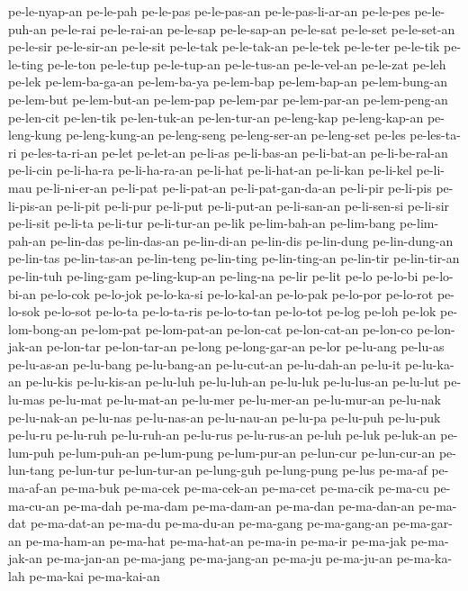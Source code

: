 {pe-le-nyap-an pe-le-pah pe-le-pas pe-le-pas-an pe-le-pas-li-ar-an
pe-le-pes pe-le-puh-an pe-le-rai pe-le-rai-an pe-le-sap pe-le-sap-an
pe-le-sat pe-le-set pe-le-set-an pe-le-sir pe-le-sir-an pe-le-sit
pe-le-tak pe-le-tak-an pe-le-tek pe-le-ter pe-le-tik pe-le-ting pe-le-ton
pe-le-tup pe-le-tup-an pe-le-tus-an pe-le-vel-an pe-le-zat pe-leh pe-lek
pe-lem-ba-ga-an pe-lem-ba-ya pe-lem-bap pe-lem-bap-an pe-lem-bung-an
pe-lem-but pe-lem-but-an pe-lem-pap pe-lem-par pe-lem-par-an
pe-lem-peng-an pe-len-cit pe-len-tik pe-len-tuk-an pe-len-tur-an
pe-leng-kap pe-leng-kap-an pe-leng-kung pe-leng-kung-an pe-leng-seng
pe-leng-ser-an pe-leng-set pe-les pe-les-ta-ri pe-les-ta-ri-an pe-let
pe-let-an pe-li-as pe-li-bas-an pe-li-bat-an pe-li-be-ral-an pe-li-cin
pe-li-ha-ra pe-li-ha-ra-an pe-li-hat pe-li-hat-an pe-li-kan pe-li-kel
pe-li-mau pe-li-ni-er-an pe-li-pat pe-li-pat-an pe-li-pat-gan-da-an
pe-li-pir pe-li-pis pe-li-pis-an pe-li-pit pe-li-pur pe-li-put
pe-li-put-an pe-li-san-an pe-li-sen-si pe-li-sir pe-li-sit pe-li-ta
pe-li-tur pe-li-tur-an pe-lik pe-lim-bah-an pe-lim-bang pe-lim-pah-an
pe-lin-das pe-lin-das-an pe-lin-di-an pe-lin-dis pe-lin-dung
pe-lin-dung-an pe-lin-tas pe-lin-tas-an pe-lin-teng pe-lin-ting
pe-lin-ting-an pe-lin-tir pe-lin-tir-an pe-lin-tuh pe-ling-gam
pe-ling-kup-an pe-ling-na pe-lir pe-lit pe-lo pe-lo-bi pe-lo-bi-an
pe-lo-cok pe-lo-jok pe-lo-ka-si pe-lo-kal-an pe-lo-pak pe-lo-por pe-lo-rot
pe-lo-sok pe-lo-sot pe-lo-ta pe-lo-ta-ris pe-lo-to-tan pe-lo-tot pe-log
pe-loh pe-lok pe-lom-bong-an pe-lom-pat pe-lom-pat-an pe-lon-cat
pe-lon-cat-an pe-lon-co pe-lon-jak-an pe-lon-tar pe-lon-tar-an pe-long
pe-long-gar-an pe-lor pe-lu-ang pe-lu-as pe-lu-as-an pe-lu-bang
pe-lu-bang-an pe-lu-cut-an pe-lu-dah-an pe-lu-it pe-lu-ka-an pe-lu-kis
pe-lu-kis-an pe-lu-luh pe-lu-luh-an pe-lu-luk pe-lu-lus-an pe-lu-lut
pe-lu-mas pe-lu-mat pe-lu-mat-an pe-lu-mer pe-lu-mer-an pe-lu-mur-an
pe-lu-nak pe-lu-nak-an pe-lu-nas pe-lu-nas-an pe-lu-nau-an pe-lu-pa
pe-lu-puh pe-lu-puk pe-lu-ru pe-lu-ruh pe-lu-ruh-an pe-lu-rus pe-lu-rus-an
pe-luh pe-luk pe-luk-an pe-lum-puh pe-lum-puh-an pe-lum-pung pe-lum-pur-an
pe-lun-cur pe-lun-cur-an pe-lun-tang pe-lun-tur pe-lun-tur-an pe-lung-guh
pe-lung-pung pe-lus pe-ma-af pe-ma-af-an pe-ma-buk pe-ma-cek pe-ma-cek-an
pe-ma-cet pe-ma-cik pe-ma-cu pe-ma-cu-an pe-ma-dah pe-ma-dam pe-ma-dam-an
pe-ma-dan pe-ma-dan-an pe-ma-dat pe-ma-dat-an pe-ma-du pe-ma-du-an
pe-ma-gang pe-ma-gang-an pe-ma-gar-an pe-ma-ham-an pe-ma-hat pe-ma-hat-an
pe-ma-in pe-ma-ir pe-ma-jak pe-ma-jak-an pe-ma-jan-an pe-ma-jang
pe-ma-jang-an pe-ma-ju pe-ma-ju-an pe-ma-ka-lah pe-ma-kai pe-ma-kai-an
}
